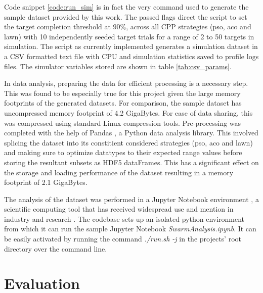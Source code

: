 \documentclass{report}
\begin{document}
Code snippet \ref{code:run_sim} is in fact the very command used to generate the sample dataset provided by this work. The passed flags direct the script to set the target completion threshold at $90\%$, across all CPP strategies (pso, aco and lawn) with 10 independently seeded target trials for a range of 2 to 50 targets in simulation. The script as currently implemented generates a simulation dataset in a CSV formatted text file with CPU and simulation statistics saved to profile logs files. The simulator variables stored are shown in table \ref{tab:csv_params}.

In data analysis, preparing the data for efficient processing is a necessary step. This was found to be especially true for this project given the large memory footprints of the generated datasets. For comparison, the sample dataset has uncompressed memory footprint of 4.2 GigaBytes. For ease of data sharing, this was compressed using standard Linux compression tools. Pre-processing was completed with the help of Pandas \cite{Pandas}, a Python data analysis library. This involved splicing the dataset into its constitient considered strategies (pso, aco and lawn) and making sure to optimize datatypes to their expected range values before storing the resultant subsets as HDF5 dataFrames. This has a significant effect on the storage and loading performance of the dataset resulting in a memory footprint of 2.1 GigaBytes.

The analysis of the dataset was performed in a Jupyter Notebook environment \cite{Jupyter}, a scientific computing tool that has received widespread use and mention in industry and research \cite{Helen2014} \cite{ACM2017}. The codebase sets up an isolated python environment from which it can run the sample Jupyter Notebook \textit{SwarmAnalysis.ipynb}. It can be easily activated by running the command \textit{./run.sh -j} in the projects' root directory over the command line.

\chapter{Evaluation} \label{evaluation}
\end{document}
